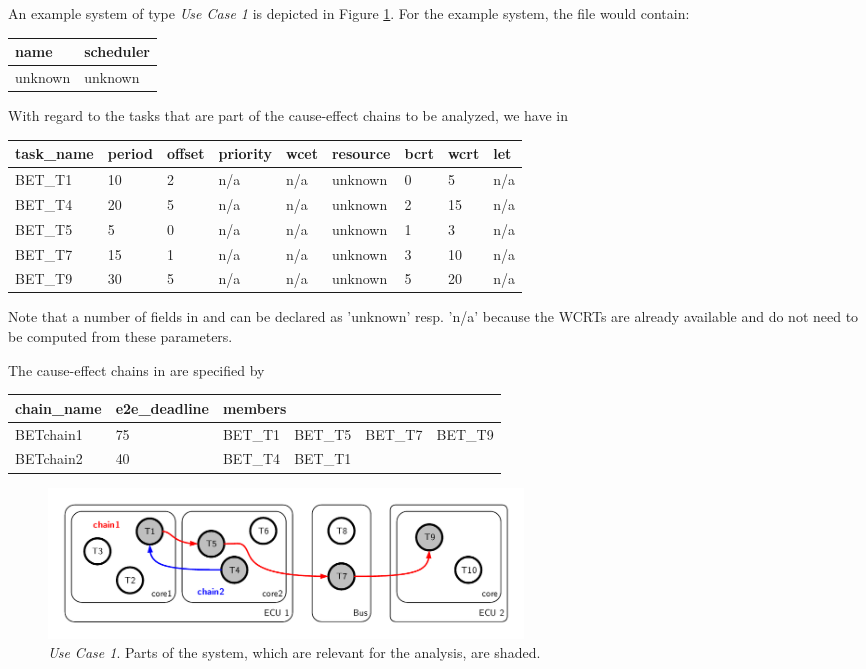 An example system of type \emph{Use Case 1} is depicted in Figure \ref{fig:use-case-1}.
For the example system, the file  would contain:
\begin{center}
	\begin{tabular}{|l|l|} \hline
		\textbf{name} & \textbf{scheduler} \\ \hline
		unknown & unknown \\ \hline
	\end{tabular}
\end{center}
With regard to the tasks that are part of the cause-effect chains to be analyzed, we have in  
\begin{center}
	\begin{tabular}{|l|l|l|l|l|l|l|l|l|} \hline
		  \textbf{task\_name}  
		& \textbf{period} 
		& \textbf{offset} 
		& \textbf{priority}
		& \textbf{wcet}
		& \textbf{resource} 
		& \textbf{bcrt}		
		& \textbf{wcrt}
		& \textbf{let} \\ \hline
		BET\_T1&10&2&n/a&n/a&unknown&0&5&n/a \\ \hline
		BET\_T4&20&5&n/a&n/a&unknown&2&15&n/a \\ \hline 
		BET\_T5&5&0&n/a&n/a&unknown&1&3&n/a \\ \hline
		BET\_T7&15&1&n/a&n/a&unknown&3&10&n/a \\ \hline
		BET\_T9&30&5&n/a&n/a&unknown&5&20&n/a	\\ \hline	
	\end{tabular}
\end{center}
Note that a number of fields in  and  can be declared as 'unknown' resp. 'n/a' because the WCRTs are already available and do not need to be computed from these parameters.
\bigskip

The cause-effect chains in  are specified by
\begin{center}
	\begin{tabular}{|l|l|l|l|l|l|} \hline
		\textbf{chain\_name} 
		& \textbf{e2e\_deadline}
		& \multicolumn{4}{|l|}{\textbf{members}} \\ \hline
			BETchain1 & 75 & BET\_T1 & BET\_T5 & BET\_T7 & BET\_T9 \\ \hline
			BETchain2 & 40 & BET\_T4 & BET\_T1 & & \\ \hline
	\end{tabular}
\end{center}
%
\begin{figure}[h!]
	\centering
		\includegraphics[height=4cm, trim = 0.5cm 0.5cm 0.5cm 0.5cm]{fig/bet1-system.pdf}
	\caption{\emph{Use Case 1}. Parts of the system, which are relevant for the analysis, are shaded.}
	\label{fig:use-case-1}
\end{figure}



